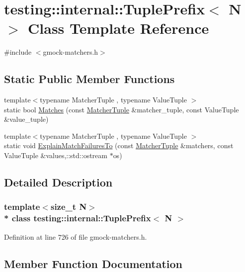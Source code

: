 \hypertarget{classtesting_1_1internal_1_1_tuple_prefix}{}\section{testing\+:\+:internal\+:\+:Tuple\+Prefix$<$ N $>$ Class Template Reference}
\label{classtesting_1_1internal_1_1_tuple_prefix}


{\ttfamily \#include $<$gmock-\/matchers.\+h$>$}

\subsection*{Static Public Member Functions}
\begin{DoxyCompactItemize}
\item 
{\footnotesize template$<$typename Matcher\+Tuple , typename Value\+Tuple $>$ }\\static bool \hyperlink{classtesting_1_1internal_1_1_tuple_prefix_ada24ceee73c02e3bb7f8264143170f7a}{Matches} (const \hyperlink{structtesting_1_1internal_1_1_matcher_tuple}{Matcher\+Tuple} \&matcher\+\_\+tuple, const Value\+Tuple \&value\+\_\+tuple)
\item 
{\footnotesize template$<$typename Matcher\+Tuple , typename Value\+Tuple $>$ }\\static void \hyperlink{classtesting_1_1internal_1_1_tuple_prefix_af983f3f9254408e6dabe67b511dd22ae}{Explain\+Match\+Failures\+To} (const \hyperlink{structtesting_1_1internal_1_1_matcher_tuple}{Matcher\+Tuple} \&matchers, const Value\+Tuple \&values,\+::std\+::ostream $\ast$os)
\end{DoxyCompactItemize}


\subsection{Detailed Description}
\subsubsection*{template$<$size\+\_\+t N$>$\\*
class testing\+::internal\+::\+Tuple\+Prefix$<$ N $>$}



Definition at line 726 of file gmock-\/matchers.\+h.



\subsection{Member Function Documentation}
